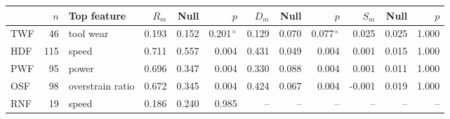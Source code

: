 \begin{tabular}{@{}lrlrrrrrrrrr@{}}
\toprule
& $n$ & Top feature & $R_m$ & Null & $p$ & $D_m$ & Null & $p$ & $S_m$ & Null & $p$ \\
\midrule
TWF & 46 & tool wear & 0.193 & 0.152 & 0.201$^{\times}$ & 0.129 & 0.070 & 0.077$^{\times}$ & 0.025 & 0.025 & 1.000 \\
HDF & 115 & speed & 0.711 & 0.557 & 0.004 & 0.431 & 0.049 & 0.004 & 0.001 & 0.015 & 1.000 \\
PWF & 95 & power & 0.696 & 0.347 & 0.004 & 0.330 & 0.088 & 0.004 & 0.001 & 0.011 & 1.000 \\
OSF & 98 & overstrain ratio & 0.672 & 0.345 & 0.004 & 0.424 & 0.067 & 0.004 & -0.001 & 0.019 & 1.000 \\
RNF & 19 & speed & 0.186 & 0.240 & 0.985 & -- & -- & -- & -- & -- & -- \\
\bottomrule
\end{tabular}
